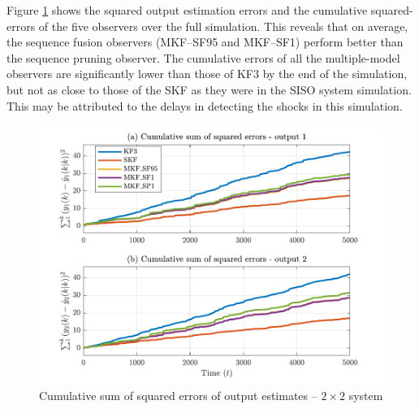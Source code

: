 Figure \ref{fig:sim-sys-sim2-MKF-cumerr} shows the squared output estimation errors and the cumulative squared-errors of the five observers over the full simulation. This reveals that on average, the sequence fusion observers (MKF--SF95 and MKF--SF1) perform better than the sequence pruning observer. The cumulative errors of all the multiple-model observers are significantly lower than those of KF3 by the end of the simulation, but not as close to those of the SKF as they were in the SISO system simulation. This may be attributed to the delays in detecting the shocks in this simulation.
\begin{figure}[htp]
	\centering
	\includegraphics[width=13cm]{images/rod_obs_sim3_all_seed_cum_err_y2.pdf}
	\caption{Cumulative sum of squared errors of output estimates –  $2\times2$ system}
	\label{fig:sim-sys-sim2-MKF-cumerr}
\end{figure}

